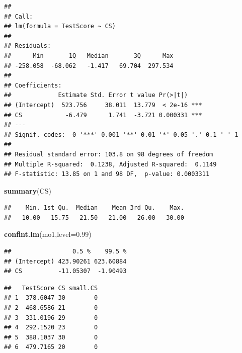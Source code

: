 \documentclass[
]{book}
\newenvironment{Shaded}{\begin{snugshade}}{\end{snugshade}}
\newcommand{\DataTypeTok}[1]{\textcolor[rgb]{0.13,0.29,0.53}{#1}}
\newcommand{\DecValTok}[1]{\textcolor[rgb]{0.00,0.00,0.81}{#1}}
\newcommand{\FloatTok}[1]{\textcolor[rgb]{0.00,0.00,0.81}{#1}}
\newcommand{\KeywordTok}[1]{\textcolor[rgb]{0.13,0.29,0.53}{\textbf{#1}}}
\newcommand{\NormalTok}[1]{#1}
\newcommand{\OperatorTok}[1]{\textcolor[rgb]{0.81,0.36,0.00}{\textbf{#1}}}
\newcommand{\StringTok}[1]{\textcolor[rgb]{0.31,0.60,0.02}{#1}}
\begin{document}
\begin{verbatim}
## 
## Call:
## lm(formula = TestScore ~ CS)
## 
## Residuals:
##      Min       1Q   Median       3Q      Max 
## -258.058  -68.062   -1.417   69.704  297.534 
## 
## Coefficients:
##             Estimate Std. Error t value Pr(>|t|)    
## (Intercept)  523.756     38.011  13.779  < 2e-16 ***
## CS            -6.479      1.741  -3.721 0.000331 ***
## ---
## Signif. codes:  0 '***' 0.001 '**' 0.01 '*' 0.05 '.' 0.1 ' ' 1
## 
## Residual standard error: 103.8 on 98 degrees of freedom
## Multiple R-squared:  0.1238, Adjusted R-squared:  0.1149 
## F-statistic: 13.85 on 1 and 98 DF,  p-value: 0.0003311
\end{verbatim}

\begin{Shaded}
\begin{Highlighting}[]
\KeywordTok{summary}\NormalTok{(CS)}
\end{Highlighting}
\end{Shaded}

\begin{verbatim}
##    Min. 1st Qu.  Median    Mean 3rd Qu.    Max. 
##   10.00   15.75   21.50   21.00   26.00   30.00
\end{verbatim}

\begin{Shaded}
\begin{Highlighting}[]
\KeywordTok{confint.lm}\NormalTok{(mo1,}\DataTypeTok{level=}\FloatTok{0.99}\NormalTok{)}
\end{Highlighting}
\end{Shaded}

\begin{verbatim}
##                 0.5 %    99.5 %
## (Intercept) 423.90261 623.60884
## CS          -11.05307  -1.90493
\end{verbatim}

\begin{Shaded}
\end{Shaded}

\begin{verbatim}
##   TestScore CS small.CS
## 1  378.6047 30        0
## 2  468.6586 21        0
## 3  331.0196 29        0
## 4  292.1520 23        0
## 5  388.1037 30        0
## 6  479.7165 20        0
\end{verbatim}
\end{document}

